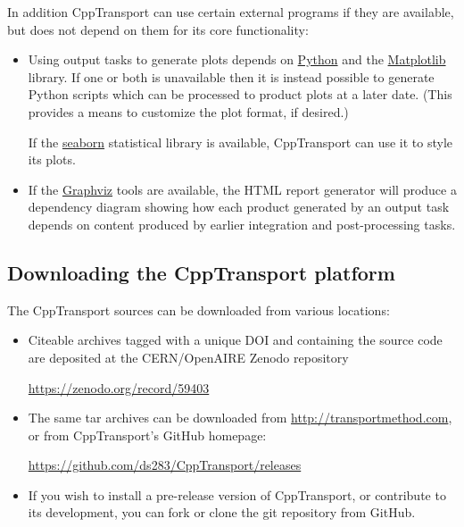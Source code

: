 \documentclass[11pt,a4paper]{article}
\newcommand{\packagefont}{\sffamily}
\newcommand{\CppTransport}{{\packagefont CppTransport}}
\newcommand{\Python}{{\packagefont Python}}
\newcommand{\Matplotlib}{{\packagefont Matplotlib}}
\newcommand{\seaborn}{{\packagefont seaborn}}
\newcommand{\Graphviz}{{\packagefont Graphviz}}
\begin{document}
In addition {\CppTransport} can use certain external programs
if they are available, but does not depend on them for its
core functionality:
\begin{itemize}
    \item Using output tasks to generate plots
    depends on \href{https://www.python.org}{\Python} and the
    \href{http://matplotlib.org}{\Matplotlib} library.
    If one or both is unavailable then it is instead possible
    to generate Python scripts which can be processed to
    product plots at a later date.
    (This provides a means to customize the plot format, if desired.)
    
    If the
    \href{https://stanford.edu/~mwaskom/software/seaborn}{\seaborn}
    statistical library is available, {\CppTransport} can use
    it to style its plots.
    
    \item If the \href{http://www.graphviz.org}{\Graphviz} tools are
    available, the HTML report generator will produce a dependency diagram
    showing how each product generated by an output task
    depends on content produced by earlier integration and
    post-processing tasks.
\end{itemize}

\subsection{Downloading the {\CppTransport} platform}
\label{sec:downloading}

The {\CppTransport} sources can be downloaded from various locations:
\begin{itemize}
    \item Citeable archives tagged with a unique
    DOI and containing the source code are deposited
    at the CERN/OpenAIRE Zenodo repository
    \begin{center}
        \url{https://zenodo.org/record/59403}    
    \end{center}

    \item The same tar archives can be downloaded from
    \url{http://transportmethod.com}, or
    from {\CppTransport}'s GitHub homepage:
    \begin{center}
        \url{https://github.com/ds283/CppTransport/releases}    
    \end{center}    
    
    \item If you wish to install a pre-release version of {\CppTransport},
    or contribute to its development, you can fork or clone the
    git repository from GitHub. 
\end{itemize}
\end{document}
